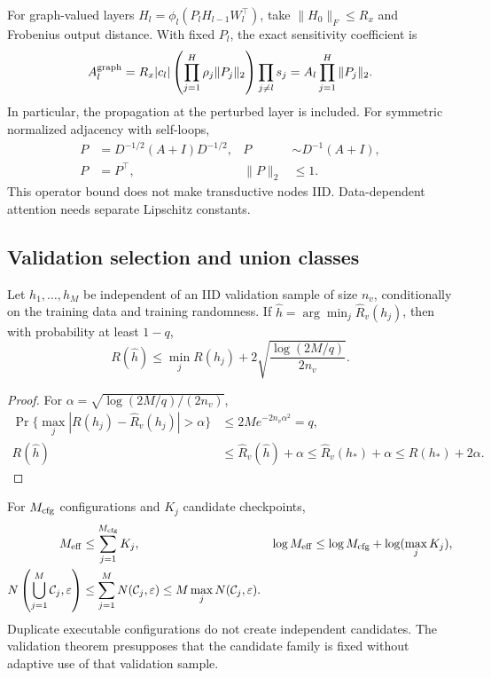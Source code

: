 \begin{proposition}
For graph-valued layers
$H_l=\phi_l(P_lH_{l-1}W_l^\top)$, take
$\|H_0\|_F\leq R_x$ and Frobenius output distance. With fixed $P_l$,
the exact sensitivity coefficient is
\begin{equation}
A_l^{\rm graph}
=R_x|c_l|\left(\prod_{j=1}^H\rho_j\|P_j\|_2\right)
\prod_{j\ne l}s_j
=A_l\prod_{j=1}^H\|P_j\|_2 .
\end{equation}
In particular, the propagation at the perturbed layer is included.
For symmetric normalized adjacency with self-loops,
\begin{align}
P&=D^{-1/2}(A+I)D^{-1/2},&
P&\sim D^{-1}(A+I),\\
P&=P^\top,&\|P\|_2&\leq1 .
\end{align}
This operator bound does not make transductive nodes IID.
Data-dependent attention needs separate Lipschitz constants.
\end{proposition}

\subsection{Validation selection and union classes}
\begin{theorem}
\label{prop:selection}
Let $h_1,\ldots,h_M$ be independent of an IID validation sample of size
$n_v$, conditionally on the training data and training randomness.
If $\widehat h=\arg\min_j\widehat R_v(h_j)$, then with probability
at least $1-q$,
\begin{equation}
R(\widehat h)\leq\min_jR(h_j)
+2\sqrt{\frac{\log(2M/q)}{2n_v}} .
\label{eq:rigid-selection}
\end{equation}
\end{theorem}
\begin{proof}
For $\alpha=\sqrt{\log(2M/q)/(2n_v)}$,
\begin{align}
\Pr\{\max_j|R(h_j)-\widehat R_v(h_j)|>\alpha\}
&\leq2Me^{-2n_v\alpha^2}=q,\\
R(\widehat h)&\leq\widehat R_v(\widehat h)+\alpha
\leq\widehat R_v(h_*)+\alpha\leq R(h_*)+2\alpha .
\end{align}
\end{proof}

\begin{proposition}
For $M_{\rm cfg}$ configurations and $K_j$ candidate checkpoints,
\begin{align}
M_{\rm eff}
&\leq\sum_{j=1}^{M_{\rm cfg}}K_j,&
\log M_{\rm eff}
&\leq\log M_{\rm cfg}+\log(\max_jK_j),\\
N\left(\bigcup_{j=1}^M\mathcal C_j,\varepsilon\right)
&\leq\sum_{j=1}^MN(\mathcal C_j,\varepsilon)
\leq M\max_jN(\mathcal C_j,\varepsilon).
\end{align}
Duplicate executable configurations do not create independent candidates.
The validation theorem presupposes that the candidate family is fixed
without adaptive use of that validation sample.
\end{proposition}


